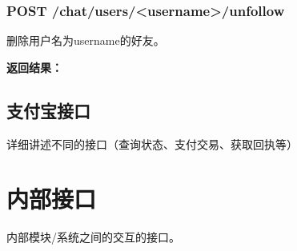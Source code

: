 \subsubsection{\textbf{POST} /chat/users/<username>/unfollow}
删除用户名为username的好友。

\textbf{返回结果：}

\subsection{支付宝接口}
详细讲述不同的接口（查询状态、支付交易、获取回执等）

\section{内部接口}
内部模块/系统之间的交互的接口。